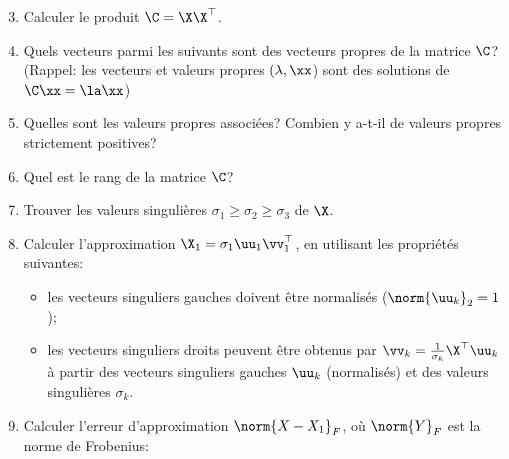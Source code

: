 \documentclass[11pt]{article}
\begin{document}
\begin{enumerate}
\setcounter{enumi}{2}
	\item Calculer le produit $\C = \X\X^\top$.
	\item Quels vecteurs parmi les suivants sont des vecteurs propres de la matrice $\C$? (Rappel: les vecteurs et valeurs propres $(\lambda,\xx$) sont des solutions de $\C\xx = \la\xx$)
	
	\item Quelles sont les valeurs propres associées? Combien y a-t-il de valeurs propres strictement positives?
	\item Quel est le rang de la matrice $\C$?
	\item Trouver les valeurs singulières $\sigma_1 \geq \sigma_2 \geq \sigma_3$ de $\X$.
	\item Calculer l'approximation $\X_1 = \sigma_1 \uu_1\vv_1^\top$, en utilisant les propriétés suivantes:
	\begin{itemize}[label=-]
		\item les vecteurs singuliers gauches doivent être normalisés ($\norm{\uu_k}_2 = 1$);
		\item les vecteurs singuliers droits peuvent être obtenus par $\vv_k = \frac{1}{\sigma_k}\X^\top \uu_k$ à partir des vecteurs singuliers gauches $\uu_k$ (normalisés) et des valeurs singulières $\sigma_k$. 
	\end{itemize}
	\item Calculer l'erreur d'approximation $\norm{X-X_1}_F$, où $\norm{Y}_F$ est la norme de Frobenius:
\end{enumerate}
\end{document}
